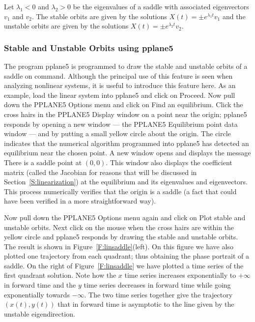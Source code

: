 \documentclass{ximera}
\begin{document}
Let $\lambda_1<0$ and $\lambda_2>0$ be the eigenvalues of a saddle with
associated eigenvectors $v_1$ and $v_2$.  The stable orbits are given by the
solutions $X(t) = \pm e^{\lambda_1 t}v_1$ and the unstable orbits are given
by the solutions $X(t) = \pm e^{\lambda_2 t}v_2$.

\subsubsection*{Stable and Unstable Orbits using {\sf pplane5}}

The program {\sf pplane5} is programmed to draw the stable and unstable
orbits of a saddle on command. Although the principal use of this
feature is seen when analyzing nonlinear systems, it is useful to
introduce this feature here.  As an example, load the linear system
 into {\sf pplane5} and click on {\sf Proceed}.  Now
pull down the {\sf PPLANE5 Options} menu and click on {\sf Find an
equilibrium}.  Click the cross hairs in the {\sf PPLANE5 Display}
window on a point near the origin; {\sf pplane5} responds by
opening a new window --- the {\sf PPLANE5 Equilibrium point data}
window --- and by putting a small yellow circle about the
origin.  The circle indicates that the numerical algorithm
programmed into {\sf pplane5} has detected an equilibrium near
the chosen point. A new window opens and displays the message
{\sf There is a saddle point at} $(0,0)$.  This window also displays the
coefficient matrix (called the Jacobian for reasons that will be discussed
in Section~\ref{S:linearization}) at the equilibrium and its eigenvalues
and eigenvectors.  This process numerically verifies that the origin
is a saddle (a fact that could have been verified in a more
straightforward way).

Now pull down the {\sf PPLANE5 Options} menu again and click on
{\sf Plot stable and unstable orbits}.  Next click on the mouse
when the cross hairs are within the yellow circle and {\sf
pplane5} responds by drawing the stable and unstable orbits.
The result is shown in Figure~\ref{F:linsaddle}(left).
On this figure we have also plotted one trajectory
from each quadrant; thus obtaining the phase portrait of a saddle.
On the right of Figure~\ref{F:linsaddle} we have plotted a
time series of the first quadrant solution.  Note how the $x$
time series increases exponentially to $+\infty$ in forward time and 
the $y$ time series decreases in forward time while going exponentially 
towards $-\infty$.  The two time series together
give the trajectory $(x(t),y(t))$ that in forward time is asymptotic
to the line given by the unstable eigendirection.
\end{document}
